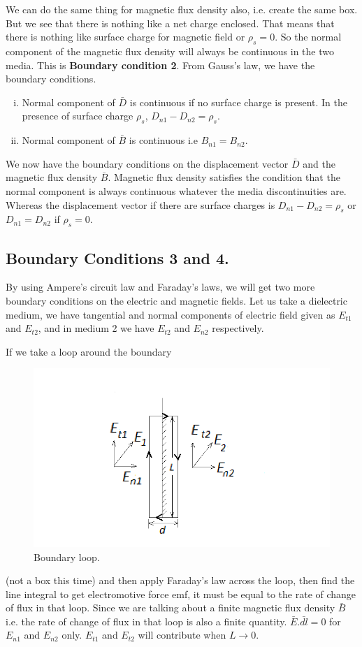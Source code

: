 We can do the same thing for magnetic flux density also, i.e. create the same box. But we see that there is nothing like a net charge enclosed. That means that there is nothing like surface charge for magnetic field or $\rho_s = 0$. So the normal component of the magnetic flux density will always be continuous in the two media. This is \textbf{Boundary condition 2}. From Gauss's law, we have the boundary conditions.
\begin{enumerate}[(i)]
\item Normal component of $\bar{D}$ is continuous if no surface charge is present. In the presence of surface charge $\rho_s$, $D_{n1}- D_{n2} = \rho_s$.
\item Normal component of $\bar{B}$ is continuous i.e $B_{n1} = B_{n2}$.
\end{enumerate}

We now have the boundary conditions on the displacement vector $\bar{D}$ and the magnetic flux density $\bar{B}$. Magnetic flux density satisfies the condition that the normal component is always continuous whatever the media discontinuities are. Whereas the displacement vector if there are surface charges  is $D_{n1}- D_{n2} = \rho_s$ or $D_{n1} = D_{n2} $ if $\rho_s = 0$. 
\subsection{Boundary Conditions 3 and 4.}
By using Ampere's circuit law and Faraday's laws, we will get two more boundary conditions on the electric and magnetic fields. Let us take a dielectric medium, we have tangential and normal components of electric field given as $E_{t1}$ and $E_{t2}$, and in medium 2 we have $E_{t2}$ and $E_{n2}$ respectively.

If we take a loop around the boundary
\begin{figure}[h]
\centering
\includegraphics[width=1\linewidth]{./graphics/diemedium4}
\caption{Boundary loop.}
\end{figure}
(not a box this time) and then apply Faraday's law across the loop, then find the line integral to get electromotive force emf, it must be equal to the rate of change of flux in that loop. Since we are talking about a finite magnetic flux density $\bar{B}$ i.e. the rate of change of flux in that loop is also a finite quantity. $\bar{E}.\bar{dl} = 0$ for $E_{n1}$ and $E_{n2}$ only. $E_{t1}$ and $E_{t2}$ will contribute when $L \longrightarrow 0$. 

